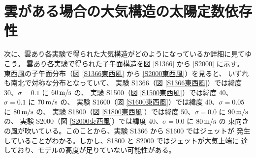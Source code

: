 \documentclass[body]{subfiles}
\begin{document}
\afterpage{\clearpage}

\section{雲がある場合の大気構造の太陽定数依存性}

次に、雲あり各実験で得られた大気構造がどのようになっているか詳細に見てゆこう。
雲あり各実験で得られた子午面構造を図 \ref{S1366} から \ref{S2000} に示す。
東西風の子午面分布（図 \ref{S1366東西風} から \ref{S2000東西風}）を見ると、
いずれも南北で対称な分布となっていて、
実験 S1366（図 \ref{S1366東西風}）では緯度 30\textdegree 、\(\sigma=0.1\) に \(60\hmu{m/s}\) の、
実験 S1500（図 \ref{S1500東西風}）では緯度 40\textdegree 、\(\sigma=0.1\) に \(70\hmu{m/s}\) の、
実験 S1600（図 \ref{S1600東西風}）では緯度 40\textdegree 、\(\sigma=0.05\) に \(80\hmu{m/s}\) の、
実験 S1800（図 \ref{S1800東西風}）では緯度 50\textdegree 、\(\sigma=0.0\) に \(90\hmu{m/s}\) の、
実験 S2000（図 \ref{S2000東西風}）では緯度 40\textdegree 、\(\sigma=0.0\) に \(80\hmu{m/s}\) の
東向きの風が吹いている。このことから、実験 S1366 から S1600 ではジェットが
発生していることがわかる。しかし、S1800 と S2000 ではジェットが大気上端に
達しており、モデルの高度が足りていない可能性がある。
\end{document}
